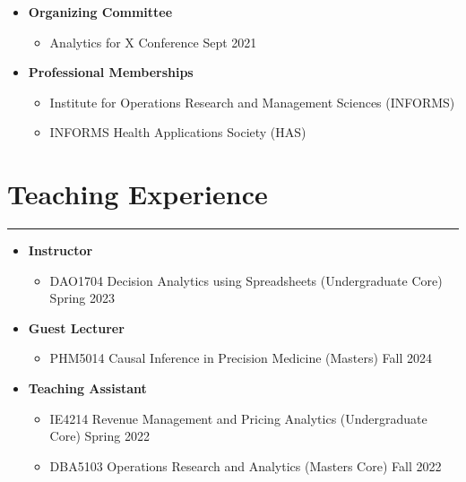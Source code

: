 \documentclass[12pt, a4paper]{article}
\begin{document}
{\begin{itemize}[leftmargin=16pt]
	\item[] \textbf{Organizing Committee}
	\begin{itemize}[parsep=2pt, label=$\bullet$]
		\item Analytics for X Conference \hfill Sept 2021
	\end{itemize}

	\item[] \textbf{Professional Memberships}
	\begin{itemize}[parsep=2pt, label=$\bullet$]
		\item Institute for Operations Research and Management Sciences (INFORMS)
		\item INFORMS Health Applications Society (HAS)
	\end{itemize}

\end{itemize}




\section*{Teaching Experience}
\vspace*{4pt}
\hrule

\begin{itemize}[leftmargin=16pt]
	\item[] \textbf{Instructor}
	\begin{itemize}[label=$\bullet$]
		\item DAO1704 Decision Analytics using Spreadsheets (Undergraduate Core) \hfill Spring 2023
	\end{itemize}

	\item[] \textbf{Guest Lecturer}
	\begin{itemize}[label=$\bullet$]
		\item PHM5014 Causal Inference in Precision Medicine (Masters) \hfill Fall 2024
	\end{itemize}

	\item[] \textbf{Teaching Assistant}
	\begin{itemize}[label=$\bullet$]
		\item IE4214 Revenue Management and Pricing Analytics (Undergraduate Core) \hfill Spring 2022
		\item DBA5103 Operations Research and Analytics (Masters Core) \hfill Fall 2022
	\end{itemize}
\end{itemize}



}
\end{document}
